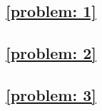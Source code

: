 \documentclass[a4paper, 12pt]{ctexart}
\let\oldlstinputlisting
\renewcommand{}[2][\empty]{
    \par\nolinenumbers\oldlstinputlisting[#1]{#2}\linenumbers\par
}
\theoremstyle{plain}
\theoremstyle{plain}
\theoremstyle{plain}
\theoremstyle{nonumberplain}
\begin{document}
    \subsection{\ref{problem: 1}}

    

    \subsection{\ref{problem: 2}}

    

    \subsection{\ref{problem: 3}}

    
\end{document}
